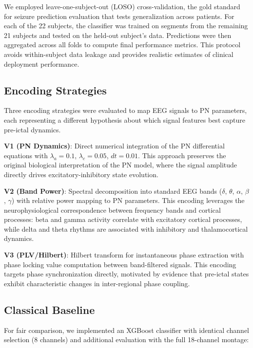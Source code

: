 \documentclass[pdflatex,sn-mathphys-num]{sn-jnl}
\begin{document}
We employed leave-one-subject-out (LOSO) cross-validation, the gold standard for seizure prediction evaluation that tests generalization across patients. For each of the 22 subjects, the classifier was trained on segments from the remaining 21 subjects and tested on the held-out subject's data. Predictions were then aggregated across all folds to compute final performance metrics. This protocol avoids within-subject data leakage and provides realistic estimates of clinical deployment performance.

\subsection{Encoding Strategies}
\label{sec:encoding}

Three encoding strategies were evaluated to map EEG signals to PN parameters, each representing a different hypothesis about which signal features best capture pre-ictal dynamics.

\textbf{V1 (PN Dynamics)}: Direct numerical integration of the PN differential equations with $\lambda_a = 0.1$, $\lambda_c = 0.05$, $dt = 0.01$. This approach preserves the original biological interpretation of the PN model, where the signal amplitude directly drives excitatory-inhibitory state evolution.

\textbf{V2 (Band Power)}: Spectral decomposition into standard EEG bands ($\delta$, $\theta$, $\alpha$, $\beta$, $\gamma$) with relative power mapping to PN parameters. This encoding leverages the neurophysiological correspondence between frequency bands and cortical processes: beta and gamma activity correlate with excitatory cortical processes, while delta and theta rhythms are associated with inhibitory and thalamocortical dynamics.

\textbf{V3 (PLV/Hilbert)}: Hilbert transform for instantaneous phase extraction with phase locking value computation between band-filtered signals. This encoding targets phase synchronization directly, motivated by evidence that pre-ictal states exhibit characteristic changes in inter-regional phase coupling.

\subsection{Classical Baseline}
\label{sec:baseline}

For fair comparison, we implemented an XGBoost \cite{chen2016xgboost} classifier with identical channel selection (8 channels) and additional evaluation with the full 18-channel montage:
\end{document}

